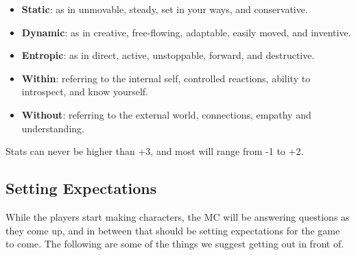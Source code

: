 \documentclass[10pt,twoside,openright]{memoir}
\begin{document}
\begin{itemize}
\tightlist
\item
  \textbf{Static}: as in unmovable, steady, set in your ways, and
  conservative.
\item
  \textbf{Dynamic}: as in creative, free-flowing, adaptable, easily
  moved, and inventive.
\item
  \textbf{Entropic}: as in direct, active, unstoppable, forward, and
  destructive.
\item
  \textbf{Within}: referring to the internal self, controlled reactions,
  ability to introspect, and know yourself.
\item
  \textbf{Without}: referring to the external world, connections,
  empathy and understanding.
\end{itemize}

Stats can never be higher than +3, and most will range from -1 to +2.

\hypertarget{setting-expectations}{%
\subsection{Setting Expectations}\label{setting-expectations}}

While the players start making characters, the MC will be answering
questions as they come up, and in between that should be setting
expectations for the game to come. The following are some of the things
we suggest getting out in front of.
\end{document}
